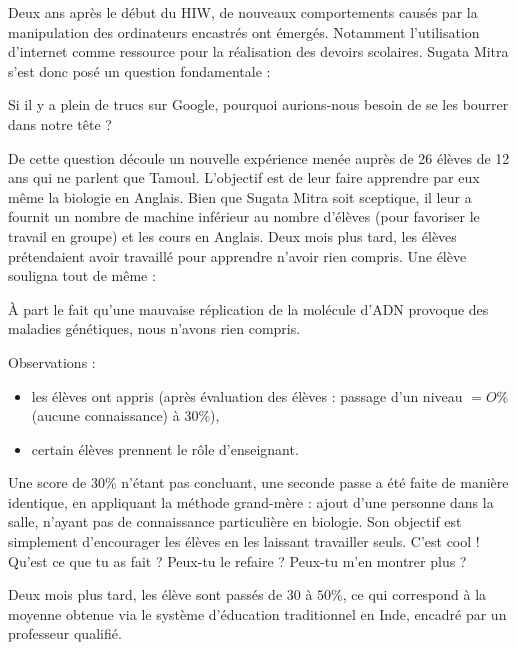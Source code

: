Deux ans après le début du \gls{HIW}, de nouveaux comportements causés par la manipulation des ordinateurs encastrés ont émergés. Notamment l'utilisation d'internet comme ressource pour la réalisation des devoirs scolaires. Sugata Mitra s'est donc posé un question fondamentale :

\begin{coolquote}
Si il y a plein de trucs sur Google, pourquoi aurions-nous besoin de se les bourrer dans notre tête ?
\end{coolquote}

De cette question découle un nouvelle expérience menée auprès de 26 élèves de 12 ans qui ne parlent que Tamoul. L'objectif est de leur faire apprendre par eux même la biologie en Anglais. Bien que Sugata Mitra soit sceptique, il leur a fournit un nombre de machine inférieur au nombre d'élèves (pour favoriser le travail en groupe) et les cours en Anglais. Deux mois plus tard, les élèves prétendaient avoir travaillé pour apprendre n'avoir rien compris. Une élève souligna tout de même :

\begin{coolquote}
  À part le fait qu'une mauvaise réplication de la molécule d'ADN provoque des maladies génétiques, nous n'avons rien compris.
\end{coolquote}

Observations : 

\begin{itemize}
\item les élèves ont appris (après évaluation des élèves : passage d'un niveau $ = O\%$ (aucune connaissance) à $30\%$),
\item certain élèves prennent le rôle d'enseignant.
\end{itemize}

Une score de $30\%$ n'étant pas concluant, une seconde passe a été faite de manière identique, en appliquant la \og méthode grand-mère \fg{} : ajout d'une personne dans la salle, n'ayant pas de connaissance particulière en biologie. Son objectif est simplement d'encourager les élèves en les laissant travailler seuls. \og C'est cool ! \fg{} \og Qu'est ce que tu as fait ? \fg{} \og Peux-tu le refaire ? \fg{} \og Peux-tu m'en montrer plus ? \fg{} 

Deux mois plus tard, les élève sont passés de $30$ à $50\%$, ce qui correspond à la moyenne obtenue via le système d'éducation traditionnel en Inde, encadré par un professeur qualifié.

